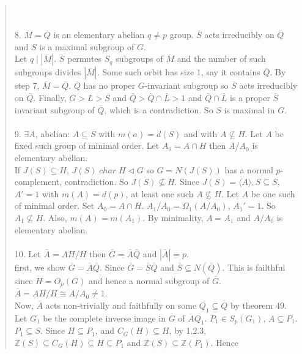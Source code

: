 \begin{quote}
\\
\\
8. ${\overline M} = {\overline Q}$ is an elementary abelian $q \neq p$ group.  ${\overline S}$
acts irreducibly on ${\overline Q}$ and $S$ is a maximal subgroup of $G$.
\\
Let $q \mid |{\overline M}|$.  ${\overline S}$ permutes $S_q$ subgroups of ${\overline M}$ and the
number of such subgroups divides $|{\overline M}|$.  Some such orbit has size $1$, say it contains
${\overline Q}$.  By step 7, ${\overline M} = {\overline Q}$.
${\overline Q}$ has no proper $G$-invariant
subgroup so ${\overline S}$ acts irreducibly on ${\overline Q}$.  Finally, $G > L >S$ and
${\overline Q} > {\overline Q} \cap {\overline L} > 1$ and ${\overline Q} \cap {\overline L}$ is
a proper ${\overline S}$ invariant subgroup of ${\overline Q}$, which is a contradiction.  So
$S$ is maximal in $G$.
\\
\\
9. $\exists A$, abelian: $A \subseteq S$ with $m(a) = d(S)$ and with $A \nsubseteq H$.  Let $A$ be
fixed such group of minimal order.  Let $A_0 = A \cap H$ then $A/A_0$ is elementary abelian.
\\
If $J(S) \subseteq H$, $J(S) \; char \; H \lhd G$ so $G = N(J(S))$
has a normal $p$-complement, contradiction.
So $J(S) \nsubseteq H$.  Since $J(S) = \langle A \rangle, S \subseteq S$, 
$A' =1$ with $m(A)=d(p)$,
at least one such $A \nsubseteq H$.  Let $A$ be one such of minimal order.  
Set $A_0 = A \cap H$.  $A_1/A_0 = \Omega_1(A/A_0)$,
$A_1'=1$.  So $A_1 \nsubseteq H$. Also, $m(A)= m(A_1)$.
By minimality, $A = A_1$ and $A/A_0$ is elementary abelian.
\\
\\
10. Let ${\overline A} = AH/H$ then ${\overline G} = {\overline A} {\overline Q}$ and $|{\overline A}| = p$.
\\
first, we show ${\overline G} = {\overline A} {\overline Q}$.
Since ${\overline G} = {\overline S} {\overline Q}$ and
${\overline S} \subseteq N({\overline Q})$.  This is failthful since $H = O_p(G)$ and hence a normal subgroup
of ${\overline G}$.  ${\overline A} = AH/H \cong A/A_0 \neq 1$.
\\
Now, ${\overline A}$ acts non-trivially and faithfully on some
${\overline {Q_1}} \subseteq {\overline Q}$ by theorem 49. 
Let $G_1$ be the complete inverse image in ${\overline G}$ of ${\overline A} {\overline {Q_1}}$.
$P_1 \in S_p(G_1)$, $A \subseteq P_1$. $P_1 \subseteq S$.  
Since $H \subseteq P_1$, and $C_G(H) \subseteq H$, by
1.2.3, ${\mathbb Z}(S) \subseteq C_G(H) \subseteq H \subseteq P_1$ and ${\mathbb Z}(S) \subseteq {\mathbb Z}(P_1)$.  Hence

\end{quote}
